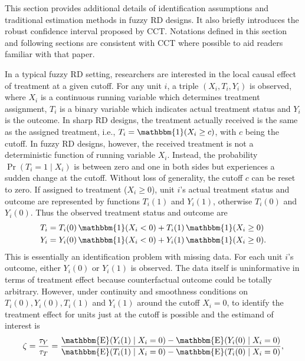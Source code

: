 \documentclass[12pt,]{article}
\DeclareMathOperator{\1}{\mathbbm{1}}
\DeclareMathOperator{\E}{\mathbbm{E}}
\renewcommand{\Pr}{\operatorname{Pr}}
\begin{document}
This section provides additional details of identification assumptions and traditional estimation methods in fuzzy RD designs. It also briefly introduces the robust confidence interval proposed by CCT. Notations defined in this section and following sections are consistent with CCT where possible to aid readers familiar with that paper.

In a typical fuzzy RD setting, researchers are interested in the local causal effect of treatment at a given cutoff. For any unit $i$, a triple $(X_i, T_i, Y_i)$ is observed, where $X_i$ is a continuous running variable which determines treatment assignment, $T_i$ is a binary variable which indicates actual treatment status and $Y_i$ is the outcome. In sharp RD designs, the treatment actually received is the same as the assigned treatment, i.e., $T_i = \1(X_i \ge c)$, with $c$ being the cutoff. In fuzzy RD designs, however, the received treatment is not a deterministic function of running variable $X_i$. Instead, the probability $\Pr (T_i = 1 \mid X_i)$ is between zero and one in both sides but experiences a sudden change at the cutoff. Without loss of generality, the cutoff $c$ can be reset to zero. If assigned to treatment ($X_i \ge 0$), unit $i$'s actual treatment status and outcome are represented by functions $T_i(1)$ and $Y_i(1)$, otherwise $T_i(0)$ and $Y_i(0)$. Thus the observed treatment status and outcome are
\begin{align*}
	T_i & = T_i(0) \1 (X_i < 0) + T_i(1) \1 (X_i \ge 0) \\
	Y_i & = Y_i(0) \1 (X_i < 0) + Y_i(1) \1 (X_i \ge 0).
\end{align*}
This is essentially an identification problem with missing data. For each unit $i$'s outcome, either $Y_i(0)$ or $Y_i(1)$ is observed. The data itself is uninformative in terms of treatment effect because counterfactual outcome could be totally arbitrary. However, under continuity and smoothness conditions on $T_i(0), Y_i(0), T_i(1)$ and $Y_i(1)$ around the cutoff $X_i = 0$, to identify the treatment effect for units just at the cutoff is possible and the estimand of interest is
\begin{equation}
	\label{eq: frd definition}
	\zeta = \frac{\tau_Y}{\tau_T} = \frac{\E (Y_i(1) \mid X_i = 0) - \E (Y_i(0) \mid X_i = 0)}{\E (T_i(1) \mid X_i = 0) - \E (T_i(0) \mid X_i = 0)},
\end{equation}
\end{document}
